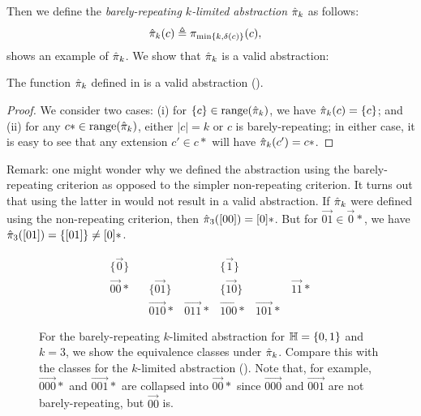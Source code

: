 Then we define the {\em barely-repeating $k$-limited abstraction} $\hat{\pi}_k$ as follows:
\begin{align}
\label{eqn:barelyAbstraction}
\hat{\pi}_k(c) & \triangleq \pi_{\min\{k,\delta(c)\}}(c),
\end{align}
 shows an example of $\hat{\pi}_k$.
We show that $\hat{\pi}_k$ is a valid abstraction:
\begin{proposition}
\label{prop:barelyAbstraction}
The function $\hat{\pi}_k$ defined in  is a valid abstraction
().
\end{proposition}
\begin{proof}
We consider two cases: (i) for $\{c\} \in \text{\rm range}(\hat{\pi}_k)$,
we have $\hat{\pi}_k(c) = \{c\}$; and (ii) for any $c* \in \text{\rm range}(\hat{\pi}_k)$,
either $|c| = k$ or $c$ is barely-repeating; in either case,
it is easy to see that any extension $c' \in c*$ will have $\hat{\pi}_k(c') = c*$.
\end{proof}
Remark: one might wonder why we defined the abstraction using the barely-repeating criterion
as opposed to the simpler non-repeating criterion.
It turns out that using the latter in  would not result in a valid abstraction.
If $\hat{\pi}_k$ were defined using the non-repeating criterion,
then $\hat{\pi}_3([00]) = [0]*$.
But for $\vec{01} \in \vec{0}*$, we have $\hat{\pi}_3([01]) = \{[01]\} \neq [0]*$.

\begin{figure}
\[
\begin{array}{lllllll}
\{\vec{0}\}    &            &              &            & \{\vec{1}\} \\
\vec{00}*      &            & \{\vec{01}\} &            & \{\vec{10}\} &            & \vec{11}* \\
               &            & \vec{010}*   & \vec{011}* & \vec{100}*   & \vec{101}* &
\end{array}
\]
\caption{\label{fig:barelyExample} For the barely-repeating $k$-limited abstraction
for ${\mathbb H} = \{0,1\}$ and $k = 3$, we show the equivalence classes under $\hat{\pi}_k$.
Compare this with the classes for the $k$-limited abstraction ().
Note that, for example,
$\vec{000}*$ and $\vec{001}*$ are collapsed into $\vec{00}*$ since $\vec{000}$ and $\vec{001}$ are not barely-repeating,
but $\vec{00}$ is.
}
\end{figure}


